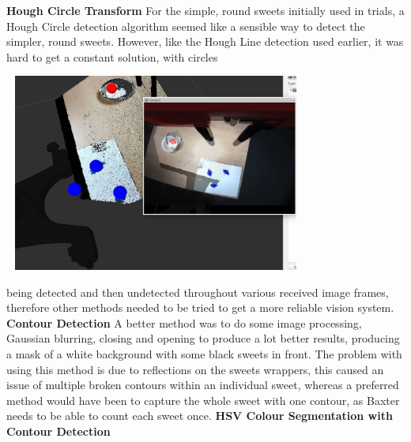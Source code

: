 \newline
\begin{minipage}[t]{0.30\textwidth}
\raggedright
\smallskip
\textbf{Hough Circle Transform}
\newline
For the simple, round sweets initially used in trials, a Hough Circle detection algorithm seemed like a sensible way to detect the simpler, round sweets. However, like the Hough Line detection used earlier, it was hard to get a constant solution, with circles  
\smallskip
\end{minipage}
\hspace{0.5cm}
\begin{minipage}[t]{0.64\textwidth}
\smallskip
\centering
\includegraphics[width = 10cm, height = 6.5cm]{sweettransformation.jpg}
\centering
{}
\bigskip
\end{minipage}
being detected and then undetected throughout various received image frames, therefore other methods needed to be tried to get a more reliable vision system.
\newline
\newline
\textbf{Contour Detection}
\newline
A better method was to do some image processing, Gaussian blurring, closing and opening to produce a lot better results, producing a mask of a white background with some black sweets in front. The problem with using this method is due to reflections on the sweets wrappers, this caused an issue of multiple broken contours within an individual sweet, whereas a preferred method would have been to capture the whole sweet with one contour, as Baxter needs to be able to count each sweet once.
\newline
\newline
\textbf{HSV Colour Segmentation with Contour Detection}
\newline

